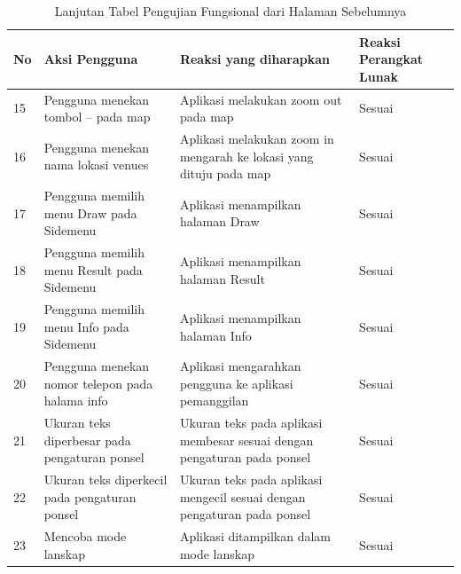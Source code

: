 \begin{table}[H]
\caption{Lanjutan Tabel Pengujian Fungsional dari Halaman Sebelumnya}
\label{table:tabelPengujianFungsional}
\begin{tabular}{|p{0.3cm}|p{5.7cm}|p{5.7cm}|p{3cm}|}
\hline
No & Aksi Pengguna                                                                      & Reaksi yang diharapkan                                                               & Reaksi Perangkat Lunak \\ \hline
15 & Pengguna menekan tombol – pada map                                                 & Aplikasi melakukan zoom out pada map                                                 & Sesuai                 \\ \hline
16 & Pengguna menekan nama lokasi venues                                                & Aplikasi melakukan zoom in mengarah ke lokasi yang dituju pada map                   & Sesuai                 \\ \hline
17 & Pengguna memilih menu Draw pada Sidemenu                                            & Aplikasi menampilkan halaman Draw                                                    & Sesuai                 \\ \hline
18 & Pengguna memilih menu Result pada Sidemenu                                          & Aplikasi menampilkan halaman Result                                                  & Sesuai                 \\ \hline
19 & Pengguna memilih menu Info pada Sidemenu                                            & Aplikasi menampilkan halaman Info                                                    & Sesuai                 \\ \hline
20 & Pengguna menekan nomor telepon pada halama info                                    & Aplikasi mengarahkan pengguna ke aplikasi pemanggilan                                & Sesuai                 \\ \hline
21 & Ukuran teks diperbesar pada pengaturan ponsel         & Ukuran teks pada aplikasi membesar sesuai dengan pengaturan pada ponsel & Sesuai                 \\ \hline
22 & Ukuran teks diperkecil pada pengaturan ponsel         & Ukuran teks pada aplikasi mengecil sesuai dengan pengaturan pada ponsel & Sesuai                 \\ \hline
23 & Mencoba mode lanskap                           & Aplikasi ditampilkan dalam mode lanskap & Sesuai                 \\ \hline
\end{tabular}
\end{table}
